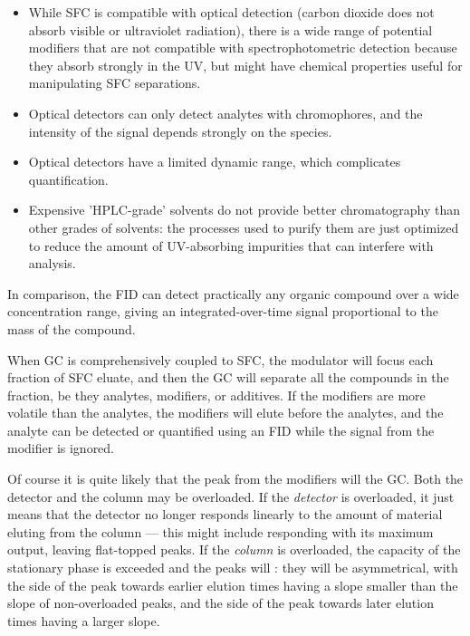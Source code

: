 \begin{itemize}

\item While SFC is compatible with optical detection (carbon dioxide does not
absorb visible or ultraviolet radiation), there is a wide range of potential
modifiers that are not compatible with spectrophotometric detection because they
absorb strongly in the UV, but might have chemical properties useful for
manipulating SFC separations. 

\item Optical detectors can only detect analytes with chromophores, and the
intensity of the signal depends strongly on the species.

\item Optical detectors have a limited dynamic range, which complicates
quantification.

\item Expensive 'HPLC-grade' solvents do not provide better chromatography than
other grades of solvents: the processes used to purify them are just optimized to
reduce the amount of UV-absorbing impurities that can interfere with analysis.

\end{itemize}

In comparison, the FID can detect practically any organic compound over a wide
concentration range, giving an integrated-over-time signal proportional to the
mass of the compound.

When GC is comprehensively coupled to SFC, the modulator will focus each
fraction of SFC eluate, and then the GC will separate all the compounds in the
fraction, be they analytes, modifiers, or additives. If the modifiers are more 
volatile than the analytes, the modifiers will elute before the analytes, and
the analyte can be detected or quantified using an FID while the signal from the
modifier is ignored.

Of course it is quite likely that the peak from the modifiers will
 the GC. Both the detector and the column may be overloaded.
If the \emph{detector} is overloaded, it just means that the detector no
longer responds linearly to the amount of material eluting from the column ---
this might include responding with its maximum output, leaving flat-topped
peaks. If the \emph{column} is overloaded, the capacity of the stationary
phase is exceeded and the peaks will : they will be asymmetrical,
with the side of the peak towards earlier elution times having a slope smaller
than the slope of non-overloaded peaks, and the side of the peak towards later
elution times having a larger slope.

